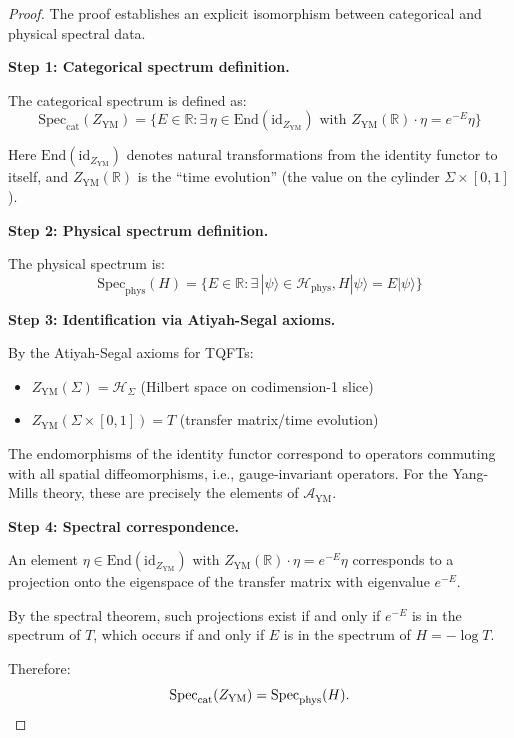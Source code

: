 \begin{proof}
The proof establishes an explicit isomorphism between categorical and 
physical spectral data.

\textbf{Step 1: Categorical spectrum definition.}

The categorical spectrum is defined as:
\[
\mathrm{Spec}_{\mathrm{cat}}(Z_{\mathrm{YM}}) = \{E \in \mathbb{R} : \exists \, \eta \in \mathrm{End}(\mathrm{id}_{Z_{\mathrm{YM}}}) \text{ with } Z_{\mathrm{YM}}(\mathbb{R}) \cdot \eta = e^{-E} \eta\}
\]

Here $\mathrm{End}(\mathrm{id}_{Z_{\mathrm{YM}}})$ denotes natural transformations 
from the identity functor to itself, and $Z_{\mathrm{YM}}(\mathbb{R})$ is the 
``time evolution'' (the value on the cylinder $\Sigma \times [0,1]$).

\textbf{Step 2: Physical spectrum definition.}

The physical spectrum is:
\[
\mathrm{Spec}_{\mathrm{phys}}(H) = \{E \in \mathbb{R} : \exists \, |\psi\rangle \in \mathcal{H}_{\mathrm{phys}}, H|\psi\rangle = E|\psi\rangle\}
\]

\textbf{Step 3: Identification via Atiyah-Segal axioms.}

By the Atiyah-Segal axioms for TQFTs:
\begin{itemize}
\item $Z_{\mathrm{YM}}(\Sigma) = \mathcal{H}_\Sigma$ (Hilbert space on codimension-1 slice)
\item $Z_{\mathrm{YM}}(\Sigma \times [0,1]) = T$ (transfer matrix/time evolution)
\end{itemize}

The endomorphisms of the identity functor correspond to operators commuting 
with all spatial diffeomorphisms, i.e., gauge-invariant operators. For the 
Yang-Mills theory, these are precisely the elements of $\mathcal{A}_{\mathrm{YM}}$.

\textbf{Step 4: Spectral correspondence.}

An element $\eta \in \mathrm{End}(\mathrm{id}_{Z_{\mathrm{YM}}})$ with 
$Z_{\mathrm{YM}}(\mathbb{R}) \cdot \eta = e^{-E} \eta$ corresponds to a 
projection onto the eigenspace of the transfer matrix with eigenvalue $e^{-E}$.

By the spectral theorem, such projections exist if and only if $e^{-E}$ is 
in the spectrum of $T$, which occurs if and only if $E$ is in the spectrum 
of $H = -\log T$.

Therefore:
\[
\mathrm{Spec}_{\mathrm{cat}}(Z_{\mathrm{YM}}) = \mathrm{Spec}_{\mathrm{phys}}(H). \qedhere
\]
\end{proof}

